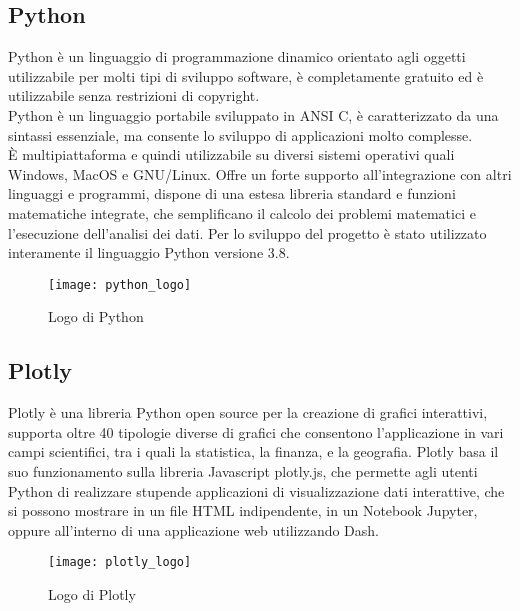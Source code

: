 \subsection{Python}
Python è un linguaggio di programmazione dinamico orientato agli oggetti utilizzabile per molti tipi di sviluppo software, è completamente gratuito ed è utilizzabile senza restrizioni di copyright.\\
Python è un linguaggio portabile sviluppato in ANSI C, è caratterizzato da una sintassi essenziale, ma consente lo sviluppo di applicazioni molto complesse.\\
È multipiattaforma e quindi utilizzabile su diversi  sistemi operativi quali Windows, MacOS e GNU/Linux.
Offre un forte supporto all'integrazione con altri linguaggi e programmi, dispone di una estesa libreria standard e funzioni matematiche integrate, che semplificano il calcolo dei problemi matematici e l'esecuzione dell'analisi dei dati.
\noindent Per lo sviluppo del progetto è stato utilizzato interamente il linguaggio Python versione 3.8.
\begin{figure}[htp]
    \centering
    \texttt{[image: python\_logo]}
    \caption{Logo di Python}
\end{figure}

\subsection{Plotly}

Plotly è una libreria Python open source  per la creazione di grafici interattivi, supporta oltre 40 tipologie diverse di grafici che consentono l’applicazione in vari campi scientifici, tra i quali la statistica, la finanza, e la geografia.
Plotly basa il suo funzionamento sulla libreria Javascript plotly.js, che permette agli utenti Python di realizzare stupende applicazioni di visualizzazione dati interattive, che si possono mostrare in un file HTML indipendente, in un Notebook Jupyter\footnotemark, oppure all’interno di una applicazione web utilizzando Dash.

\begin{figure}[htp]
    \centering
    \texttt{[image: plotly\_logo]}
    \caption{Logo di Plotly}
\end{figure}

